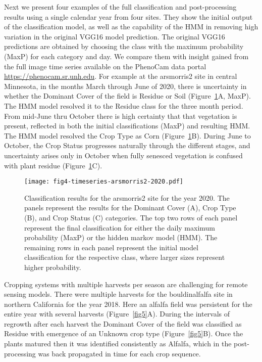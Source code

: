 \documentclass[remotesensing,article,submit,moreauthors,pdftex]{Definitions/mdpi}
\begin{document}
Next we present four examples of the full classification and post-processing results using a single calendar year from four sites. They show the initial output of the classification model, as well as the capability of the HMM in removing high variation in the original VGG16 model prediction. The original VGG16 predictions are obtained by choosing the class with the maximum probability (MaxP) for each category and day. We compare them with insight gained from the full image time series available on the PhenoCam data portal \href{https://phenocam.sr.unh.edu}{https://phenocam.sr.unh.edu}. For example at the arsmorris2 site in central Minnesota, in the months March through June of 2020, there is uncertainty in whether the Dominant Cover of the field is Residue or Soil (Figure~\ref{fig4}A, MaxP). The HMM model resolved it to the Residue class for the three month period. From mid-June thru October there is high certainty that that vegetation is present, reflected in both the initial classifications (MaxP) and resulting HMM. The HMM model resolved the Crop Type as Corn (Figure~\ref{fig4}B). During June to October, the Crop Status progresses naturally through the different stages, and uncertainty arises only in October when fully senesced vegetation is confused with plant residue (Figure~\ref{fig4}C). 

\begin{figure}[H]
    \centering
    \texttt{[image: fig4-timeseries-arsmorris2-2020.pdf]}
    \caption{Classification results for the arsmorris2 site for the year 2020. The panels represent the results for the Dominant Cover (A), Crop Type (B), and Crop Status (C) categories. The top two rows of each panel represent the final classification for either the daily maximum probability (MaxP) or the hidden markov model (HMM). The remaining rows in each panel represent the initial model classification for the respective class, where larger sizes represent higher probability.}
    \label{fig4}
\end{figure}


Cropping systems with multiple harvests per season are challenging for remote sensing models. There were multiple harvests for the bouldinalfalfa site in northern California for the year 2018. Here an alfalfa field was persistent for the entire year with several harvests (Figure~\ref{fig5}A). During the intervals of regrowth after each harvest the Dominant Cover of the field was classified as Residue with emergence of an Unknown crop type (Figure~\ref{fig5}B). Once the plants matured then it was identified consistently as Alfalfa, which in the post-processing was back propagated in time for each crop sequence.
\end{document}
